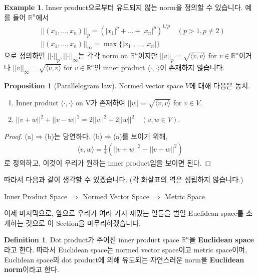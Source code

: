 \documentclass[12pt]{article}
\theoremstyle{definition}
\newtheorem{prop}[thm]{Proposition}
\newtheorem{defn}[thm]{Definition}
\newtheorem*{ex}{Example}
\def\RR{\mathbb{R}}
\newcommand{\abs}[1]{\left\vert#1\right\vert}
\newcommand{\norm}[1]{\left\vert\left\vert#1\right\vert\right\vert}
\newcommand{\inner}[2]{\langle #1, #2\rangle}
\begin{document}
	\begin{ex}
		Inner product으로부터 유도되지 않는 norm을 정의할 수 있습니다. 예를 들어 \(\RR^n\)에서
		\begin{align*}
			&\norm{(x_1, \ldots, x_n)}_p = \left(\abs{x_1}^p + \ldots + \abs{x_n}^p\right)^{1/p} \quad (p > 1, p \neq 2)\\
			&\norm{(x_1, \ldots, x_n)}_\infty = \max \{\abs{x_1}, \ldots, \abs{x_n}\}
		\end{align*}
		으로 정의하면 \(\norm{\cdot}_p, \norm{\cdot}_\infty\)는 각각 norm on \(\RR^n\)이지만 \(\norm{v}_p = \sqrt{\inner{v}{v}}\) for \(v \in \RR^n\)이거나 \(\norm{v}_\infty = \sqrt{\inner{v}{v}}\) for \(v \in \RR^n\)인 inner product \(\inner{\cdot}{\cdot}\)이 존재하지 않습니다.
	\end{ex}


	\begin{prop}[Parallelogram law]
		Normed vector space \(V\)에 대해 다음은 동치.
		\begin{enumerate}[label=(\alph*), leftmargin=2\parindent]
			\item
			Inner product \(\inner{\cdot}{\cdot}\) on V가 존재하여 \(\norm{v} = \sqrt{\inner{v}{v}}\) for \(v \in V\).
			\item
			\(\norm{v+w}^2 + \norm{v-w}^2 = 2\norm{v}^2 + 2\norm{w}^2 \quad (v, w \in V)\).
		\end{enumerate}
	\end{prop}

	\begin{proof}
		(a)\(\Rightarrow\)(b)는 당연하다. (b)\(\Rightarrow\)(a)를 보이기 위해,
		\begin{gather*}
			\inner{v}{w} = \frac{1}{4}(\norm{v+w}^2 - \norm{v-w}^2)
		\end{gather*}
		로 정의하고, 이것이 우리가 원하는 inner product임을 보이면 된다.
	\end{proof}

따라서 다음과 같이 생각할 수 있겠습니다. (각 화살표의 역은 성립하지 않습니다.)

	\begin{center}
		Inner Product Space \(\Rightarrow\) Normed Vector Space \(\Rightarrow\) Metric Space
	\end{center}

이제 마지막으로, 앞으로 우리가 여러 가지 재밌는 일들을 벌일 Euclidean space를 소개하는 것으로 이 Section을 마무리하겠습니다.

	\begin{defn} \label{def euc space}
		Dot product가 주어진 inner product space \(\RR^n\)을 \textbf{Euclidean space}라고 한다. 따라서 Euclidean space는 normed vector space이고 metric space이며, Euclidean space의 dot product에 의해 유도되는 자연스러운 norm을 \textbf{Euclidean norm}이라고 한다.
	\end{defn}
\end{document}
